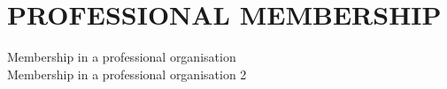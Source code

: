 \section{PROFESSIONAL MEMBERSHIP} 
    Membership in a professional organisation\\
    Membership in a professional organisation 2